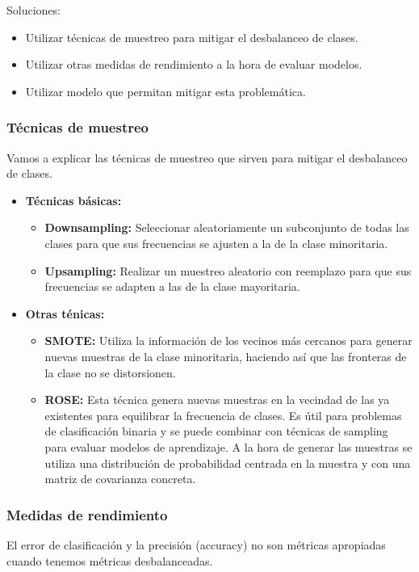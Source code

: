 \documentclass[12pt, letterpaper]{article}
\begin{document}
Soluciones:
\begin{itemize}
    \item Utilizar técnicas de muestreo para mitigar el desbalanceo de clases.
    \item Utilizar otras medidas de rendimiento a la hora de evaluar modelos.
    \item Utilizar modelo que permitan mitigar esta problemática.
\end{itemize}

\subsubsection{Técnicas de muestreo}
Vamos a explicar las técnicas de muestreo que sirven para mitigar el desbalanceo de clases.
\begin{itemize}
    \item \textbf{Técnicas básicas:}
    \begin{itemize}
        \item \textbf{Downsampling:} Seleccionar aleatoriamente un subconjunto de todas las clases para que sus frecuencias se ajusten a la de la clase minoritaria.
        \item \textbf{Upsampling:} Realizar un muestreo aleatorio con reemplazo para que sus frecuencias se adapten a las de la clase mayoritaria.
    \end{itemize}

    \item \textbf{Otras ténicas:}
    \begin{itemize}
        \item \textbf{SMOTE:} Utiliza la información de los vecinos más cercanos para generar nuevas muestras de la clase minoritaria, haciendo así que las fronteras de la clase no se distorsionen. 
        \item \textbf{ROSE:} Esta técnica genera nuevas muestras en la vecindad de las ya existentes para equilibrar la frecuencia de clases. Es útil para problemas de clasificación binaria y se puede combinar con técnicas de sampling para evaluar modelos de aprendizaje. A la hora de generar las muestras se utiliza una distribución de probabilidad centrada en la muestra y con una matriz de covarianza concreta.
    \end{itemize}
\end{itemize}

\subsubsection{Medidas de rendimiento}
El error de clasificación y la precisión (accuracy) no son métricas apropiadas cuando tenemos métricas desbalanceadas. 
\end{document}
